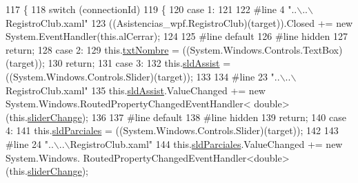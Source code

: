 \begin{DoxyCode}
117                                                                                                 \{
118             \textcolor{keywordflow}{switch} (connectionId)
119             \{
120             \textcolor{keywordflow}{case} 1:
121             
122 \textcolor{preprocessor}{            #line 4 "..\(\backslash\)..\(\backslash\)RegistroClub.xaml"}
123 \textcolor{preprocessor}{}            ((Asistencias\_wpf.RegistroClub)(target)).Closed += \textcolor{keyword}{new} System.EventHandler(\textcolor{keyword}{this}.alCerrar);
124             
125 \textcolor{preprocessor}{            #line default}
126 \textcolor{preprocessor}{}\textcolor{preprocessor}{            #line hidden}
127 \textcolor{preprocessor}{}            \textcolor{keywordflow}{return};
128             \textcolor{keywordflow}{case} 2:
129             this.\hyperlink{class_asistencias__wpf_1_1_registro_club_a9acb8f17b99701c92a5afec34b18ea0b}{txtNombre} = ((System.Windows.Controls.TextBox)(target));
130             \textcolor{keywordflow}{return};
131             \textcolor{keywordflow}{case} 3:
132             this.\hyperlink{class_asistencias__wpf_1_1_registro_club_a3488b5171d3eb821ec59219ca8d4fbf6}{sldAssist} = ((System.Windows.Controls.Slider)(target));
133             
134 \textcolor{preprocessor}{            #line 23 "..\(\backslash\)..\(\backslash\)RegistroClub.xaml"}
135 \textcolor{preprocessor}{}            this.\hyperlink{class_asistencias__wpf_1_1_registro_club_a3488b5171d3eb821ec59219ca8d4fbf6}{sldAssist}.ValueChanged += \textcolor{keyword}{new} System.Windows.RoutedPropertyChangedEventHandler<\textcolor{keywordtype}{
      double}>(this.\hyperlink{class_asistencias__wpf_1_1_registro_club_aa5c649a2b0870008205c3172101f2657}{sliderChange});
136             
137 \textcolor{preprocessor}{            #line default}
138 \textcolor{preprocessor}{}\textcolor{preprocessor}{            #line hidden}
139 \textcolor{preprocessor}{}            \textcolor{keywordflow}{return};
140             \textcolor{keywordflow}{case} 4:
141             this.\hyperlink{class_asistencias__wpf_1_1_registro_club_aff736140d07e1db41578a56e774b437c}{sldParciales} = ((System.Windows.Controls.Slider)(target));
142             
143 \textcolor{preprocessor}{            #line 24 "..\(\backslash\)..\(\backslash\)RegistroClub.xaml"}
144 \textcolor{preprocessor}{}            this.\hyperlink{class_asistencias__wpf_1_1_registro_club_aff736140d07e1db41578a56e774b437c}{sldParciales}.ValueChanged += \textcolor{keyword}{new} System.Windows.
      RoutedPropertyChangedEventHandler<\textcolor{keywordtype}{double}>(this.\hyperlink{class_asistencias__wpf_1_1_registro_club_aa5c649a2b0870008205c3172101f2657}{sliderChange});

\end{DoxyCode}
